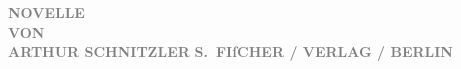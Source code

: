 \pstart
           \centering{}\textcolor{gray}{\textbf{NOVELLE}}{\\}\textcolor{gray}{\textbf{VON}}{\\}\textcolor{gray}{\textbf{ARTHUR SCHNITZLER}}\pend
           {\vspace{1\baselineskip}}
\pstart
           \centering{}\textcolor{gray}{\textbf{S. FIſCHER / VERLAG / BERLIN}}\pend
           \endnumbering{}  \newcommand{\dateiname}{L02511}\newcommand{\titel}{Arthur Schnitzler: Widmungsexemplar Spiel im Morgengrauen für Hugo Hofmannsthal, 11. 6. 1929}\newcommand{\editorInnen}{Martin Anton Müller und Gerd-Hermann Susen}
